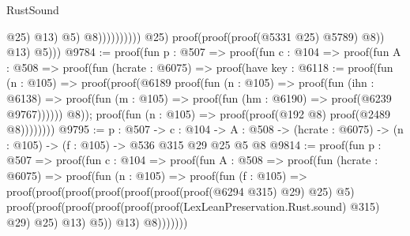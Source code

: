\begin{lexlean}{RustSound}
\begin{coremodule}
                                            @25)
                                          @13)
                                        @5)
                                      @8))))))))))
                @25)
              proof(proof(proof(@5331 @25) @5789) @8))
            @13)
          @5)))
@9784 := proof(fun {p : @507} =>
    proof(fun {c : @104} =>
      proof(fun {A : @508} =>
        proof(fun (hcrate : @6075) =>
          proof(have key : @6118 := proof(fun (n : @105) =>
              proof(proof(@6189
                    proof(fun (n : @105) =>
                      proof(fun (ihn : @6138) =>
                        proof(fun (m : @105) => proof(fun (hm : @6190) => proof(@6239 @9767))))))
                  @8));
            proof(fun (n : @105) => proof(proof(@192 @8) proof(@2489 @8))))))))
@9795 := {p : @507} ->
  {c : @104} ->
  {A : @508} -> (hcrate : @6075) -> (n : @105) -> (f : @105) -> @536 @315 @29 @25 @5 @8
@9814 := proof(fun {p : @507} =>
    proof(fun {c : @104} =>
      proof(fun {A : @508} =>
        proof(fun (hcrate : @6075) =>
          proof(fun (n : @105) =>
            proof(fun (f : @105) =>
              proof(proof(proof(proof(proof(proof(proof(@6294 @315) @29) @25) @5)
                      proof(proof(proof(proof(proof(proof(LexLeanPreservation.Rust.sound) @315) @29)
                              @25)
                            @13)
                          @5))
                    @13)
                  @8)))))))
\end{coremodule}
\end{lexlean}
